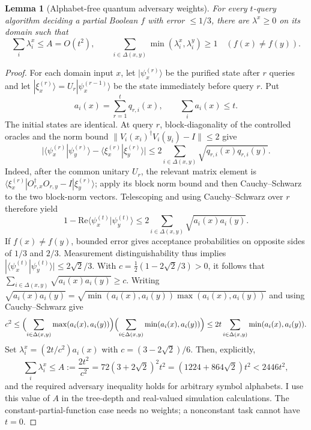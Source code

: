 \documentclass[11pt]{article}
\newtheorem{lemma}[theorem]{Lemma}
\theoremstyle{definition}\newtheorem{definition}[theorem]{Definition}
\theoremstyle{remark}\newtheorem{remark}[theorem]{Remark}
\begin{document}
\begin{lemma}[Alphabet-free quantum adversary weights]\label{lem:adversary}
For every \(t\)-query algorithm deciding a partial Boolean \(f\) with error \(\le1/3\), there are \(\lambda^x\ge0\) on its domain such that
\[
 \sum_i\lambda^x_i\le A=O(t^2),\qquad
 \sum_{i\in\Delta(x,y)}\min(\lambda^x_i,\lambda^y_i)\ge1\quad(f(x)\ne f(y)).
\]
\end{lemma}
\begin{proof}
For each domain input \(x\), let \(|\psi^{(r)}_x\rangle\) be the purified state after \(r\) queries and let \(|\xi^{(r)}_x\rangle=U_r|\psi^{(r-1)}_x\rangle\) be the state immediately before query \(r\). Put
\[
 a_i(x)=\sum_{r=1}^tq_{r,i}(x),\qquad\sum_ia_i(x)\le t.
\]
The initial states are identical. At query \(r\), block-diagonality of the controlled oracles and the norm bound \(\|V_i(x_i)^\dagger V_i(y_i)-I\|\le2\) give
\[
 \bigl|\langle\psi^{(r)}_x|\psi^{(r)}_y\rangle-\langle\xi^{(r)}_x|\xi^{(r)}_y\rangle\bigr|\le2\sum_{i\in\Delta(x,y)}\sqrt{q_{r,i}(x)q_{r,i}(y)}.
\]
Indeed, after the common unitary \(U_r\), the relevant matrix element is \(\langle\xi^{(r)}_x|O^\dagger_{r,x}O_{r,y}-I|\xi^{(r)}_y\rangle\); apply its block norm bound and then Cauchy--Schwarz to the two block-norm vectors. Telescoping and using Cauchy--Schwarz over \(r\) therefore yield
\[
 1-\mathrm{Re}\langle\psi^{(t)}_x|\psi^{(t)}_y\rangle\le2\sum_{i\in\Delta(x,y)}\sqrt{a_i(x)a_i(y)}.
\]
If \(f(x)\ne f(y)\), bounded error gives acceptance probabilities on opposite sides of \(1/3\) and \(2/3\). Measurement distinguishability thus implies \(|\langle\psi^{(t)}_x|\psi^{(t)}_y\rangle|\le2\sqrt2/3\). With \(c=\frac12(1-2\sqrt2/3)>0\), it follows that \(\sum_{i\in\Delta(x,y)}\sqrt{a_i(x)a_i(y)}\ge c\). Writing \(\sqrt{a_i(x)a_i(y)}=\sqrt{\min(a_i(x),a_i(y))\max(a_i(x),a_i(y))}\) and using Cauchy--Schwarz give
\[
 c^2\le\Bigl(\sum_{i\in\Delta(x,y)}\max(a_i(x),a_i(y))\Bigr)\Bigl(\sum_{i\in\Delta(x,y)}\min(a_i(x),a_i(y))\Bigr)\le2t\sum_{i\in\Delta(x,y)}\min(a_i(x),a_i(y)).
\]
Set \(\lambda^x_i=(2t/c^2)a_i(x)\) with \(c=(3-2\sqrt2)/6\). Then, explicitly,
\[
 \sum_i\lambda^x_i\le A:=\frac{2t^2}{c^2}=72(3+2\sqrt2)^2t^2=(1224+864\sqrt2)t^2<2446t^2,
\]
and the required adversary inequality holds for arbitrary symbol alphabets. I use this value of \(A\) in the tree-depth and real-valued simulation calculations. The constant-partial-function case needs no weights; a nonconstant task cannot have \(t=0\).
\end{proof}
\end{document}
